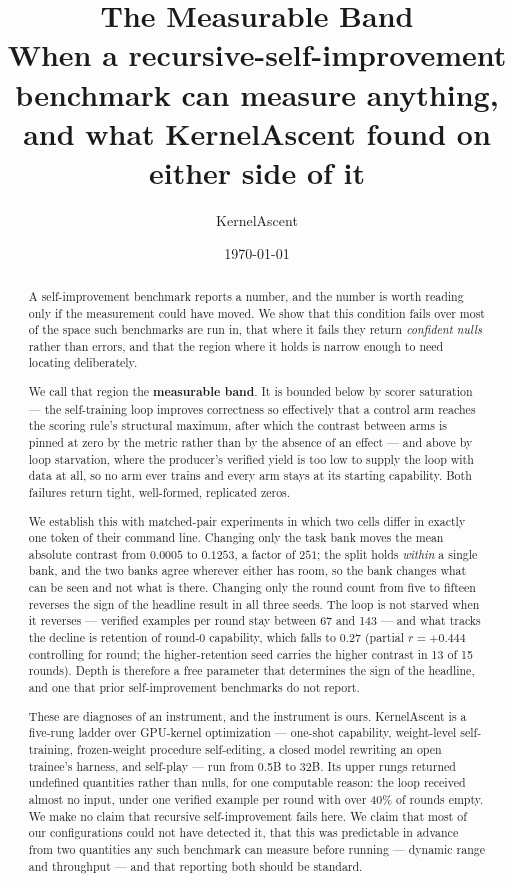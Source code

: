 \documentclass[11pt]{article}
\title{\textbf{The Measurable Band}\\[2mm]
\large When a recursive-self-improvement benchmark can measure anything,\\
and what KernelAscent found on either side of it}
\author{KernelAscent}
\date{\today}
\begin{document}
\maketitle

\begin{abstract}
A self-improvement benchmark reports a number, and the number is worth reading only if the
measurement could have moved. We show that this condition fails over most of the space such
benchmarks are run in, that where it fails they return \emph{confident nulls} rather than
errors, and that the region where it holds is narrow enough to need locating deliberately.

We call that region the \textbf{measurable band}. It is bounded below by scorer saturation ---
the self-training loop improves correctness so effectively that a control arm reaches the
scoring rule's structural maximum, after which the contrast between arms is pinned at zero by
the metric rather than by the absence of an effect --- and above by loop starvation, where the
producer's verified yield is too low to supply the loop with data at all, so no arm ever trains
and every arm stays at its starting capability. Both failures return tight, well-formed,
replicated zeros.

We establish this with matched-pair experiments in which two cells differ in exactly one token
of their command line. Changing only the task bank moves the mean absolute contrast from
$0.0005$ to $0.1253$, a factor of $251$; the split holds \emph{within} a single bank, and the
two banks agree wherever either has room, so the bank changes what can be seen and not what is
there. Changing only the round count from five to fifteen reverses the sign of the headline
result in all three seeds. The loop is not starved when it reverses --- verified examples per
round stay between 67 and 143 --- and what tracks the decline is retention of round-0
capability, which falls to $0.27$ (partial $r=+0.444$ controlling for round; the
higher-retention seed carries the higher contrast in 13 of 15 rounds). Depth is therefore a
free parameter that determines the sign of the headline, and one that prior self-improvement
benchmarks do not report.

These are diagnoses of an instrument, and the instrument is ours. KernelAscent is a five-rung
ladder over GPU-kernel optimization --- one-shot capability, weight-level self-training,
frozen-weight procedure self-editing, a closed model rewriting an open trainee's harness, and
self-play --- run from 0.5B to 32B. Its upper rungs returned undefined quantities rather than
nulls, for one computable reason: the loop received almost no input, under one verified example
per round with over 40\% of rounds empty. We make no claim that recursive self-improvement
fails here. We claim that most of our configurations could not have detected it, that this was
predictable in advance from two quantities any such benchmark can measure before running ---
dynamic range and throughput --- and that reporting both should be standard.


\end{abstract}
\end{document}
